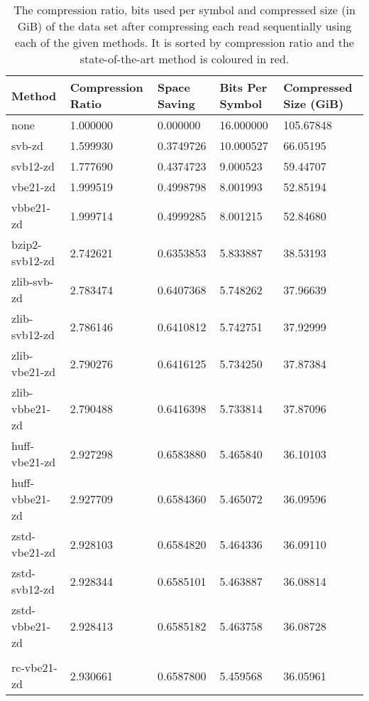 \begin{table}
    \caption{\label{tab:results-space} The compression ratio, bits used per
	symbol and compressed size (in GiB) of the data set after compressing
	each read sequentially using each of the given methods. It is
	sorted by compression ratio and the state-of-the-art method is coloured
	in red.}
	\begin{tabular}{|l|l|l|l|l|}
	    \hline
		Method & Compression Ratio & Space Saving & Bits Per Symbol & Compressed Size (GiB) \\
\hline
		none   & 1.000000 & 0.000000 & 16.000000 &105.67848\\
              svb-zd   & 1.599930  &  0.3749726 &10.000527 & 66.05195\\
            svb12-zd   & 1.777690  &  0.4374723 & 9.000523 & 59.44707\\
            vbe21-zd   & 1.999519  &  0.4998798 & 8.001993 & 52.85194\\
           vbbe21-zd   & 1.999714  &  0.4999285 & 8.001215 & 52.84680\\
      bzip2-svb12-zd   & 2.742621  &  0.6353853 & 5.833887 & 38.53193\\
         zlib-svb-zd   & 2.783474  &  0.6407368 & 5.748262 & 37.96639\\
       zlib-svb12-zd   & 2.786146  &  0.6410812 & 5.742751 & 37.92999\\
       zlib-vbe21-zd   & 2.790276  &  0.6416125 & 5.734250 & 37.87384\\
      zlib-vbbe21-zd   & 2.790488  &  0.6416398 & 5.733814 & 37.87096\\
    huff-vbe21-zd   & 2.927298  &  0.6583880 & 5.465840 & 36.10103\\
   huff-vbbe21-zd   & 2.927709  &  0.6584360 & 5.465072 & 36.09596\\
       zstd-vbe21-zd   & 2.928103  &  0.6584820 & 5.464336 & 36.09110\\
       zstd-svb12-zd   & 2.928344  &  0.6585101 & 5.463887 & 36.08814\\
      zstd-vbbe21-zd   & 2.928413  &  0.6585182 & 5.463758 & 36.08728\\
		\color{red}{zstd-svb-zd}   & \color{red}{2.928430}  &  \color{red}{0.6585201} & \color{red}{5.463727} & \color{red}{36.08708}\\
         rc-vbe21-zd   & 2.930661  &  0.6587800 & 5.459568 & 36.05961\\

\end{tabular}
\end{table}
